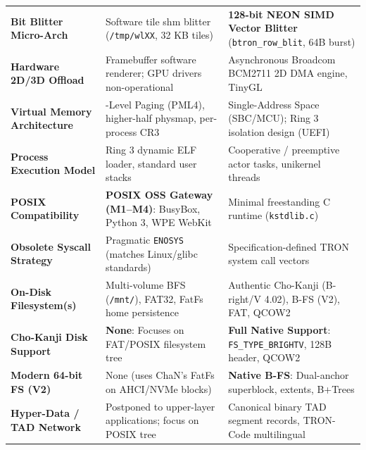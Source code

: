 \documentclass[10pt,journal,compsoc,twocolumn]{article}
\begin{document}
\begin{table}[t]
\begin{tabularx}{\textwidth}{@{} >{\raggedright\arraybackslash\bfseries}p{3.4cm} >{\raggedright\arraybackslash}X >{\raggedright\arraybackslash}X @{}}
Bit Blitter Micro-Arch & Software tile shm blitter (\texttt{/tmp/wlXX}, 32 KB tiles) & \textbf{128-bit NEON SIMD Vector Blitter} (\texttt{btron\_row\_blit}, 64B burst) \\
Hardware 2D/3D Offload & Framebuffer software renderer; GPU drivers non-operational & Asynchronous Broadcom BCM2711 2D DMA engine, TinyGL \\
\midrule
Virtual Memory Architecture & 4-Level Paging (PML4), higher-half physmap, per-process CR3 & Single-Address Space (SBC/MCU); Ring 3 isolation design (UEFI) \\
Process Execution Model & Ring 3 dynamic ELF loader, standard user stacks & Cooperative / preemptive actor tasks, unikernel threads \\
POSIX Compatibility & \textbf{POSIX OSS Gateway (M1--M4)}: BusyBox, Python 3, WPE WebKit & Minimal freestanding C runtime (\texttt{kstdlib.c}) \\
Obsolete Syscall Strategy & Pragmatic \texttt{ENOSYS} (matches Linux/glibc standards) & Specification-defined TRON system call vectors \\
\midrule
On-Disk Filesystem(s) & Multi-volume BFS (\texttt{/mnt/}), FAT32, FatFs home persistence & Authentic Cho-Kanji (B-right/V 4.02), B-FS (V2), FAT, QCOW2 \\
Cho-Kanji Disk Support & \textbf{None}: Focuses on FAT/POSIX filesystem tree & \textbf{Full Native Support}: \texttt{FS\_TYPE\_BRIGHTV}, 128B header, QCOW2 \\
Modern 64-bit FS (V2) & None (uses ChaN's FatFs on AHCI/NVMe blocks) & \textbf{Native B-FS}: Dual-anchor superblock, extents, B+Trees \\
Hyper-Data / TAD Network & Postponed to upper-layer applications; focus on POSIX tree & Canonical binary TAD segment records, TRON-Code multilingual \\
\bottomrule
\end{tabularx}
\end{table}
\end{document}
